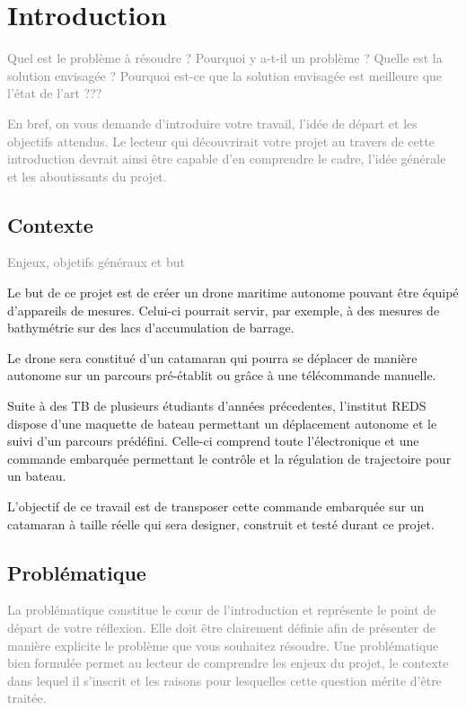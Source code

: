 \chapter{Introduction}

\textcolor{gray}{Quel est le problème à résoudre ? Pourquoi y a-t-il un problème ? Quelle est la solution envisagée ? Pourquoi est-ce que la solution envisagée est meilleure que l'état de l'art ???}

\textcolor{gray}{En bref, on vous demande d'introduire votre travail, l'idée de départ et les objectifs attendus. Le lecteur qui découvrirait votre projet au travers de cette introduction devrait ainsi être capable d'en comprendre le cadre, l'idée générale et les aboutissants du projet.}

\section{Contexte}

\textcolor{gray}{Enjeux, objetifs généraux et but}

Le but de ce projet est de créer un drone maritime autonome pouvant être équipé d’appareils de mesures. Celui-ci pourrait servir, par exemple, à des mesures de bathymétrie sur des lacs d’accumulation de barrage.

Le drone sera constitué d’un catamaran qui pourra se déplacer de manière autonome sur un parcours pré-établit ou grâce à une télécommande manuelle.

Suite à des TB de plusieurs étudiants d'années précedentes, l’institut REDS dispose d’une maquette de bateau permettant un déplacement autonome et le suivi d’un parcours prédéfini. Celle-ci comprend toute l’électronique et une commande embarquée permettant le contrôle et la régulation de trajectoire pour un bateau.

L’objectif de ce travail est de transposer cette commande embarquée sur un catamaran à taille réelle qui sera designer, construit et testé durant ce projet.

\section{Problématique}

\textcolor{gray}{La problématique constitue le cœur de l'introduction et représente le point de départ de votre réflexion. Elle doit être clairement définie afin de présenter de manière explicite le problème que vous souhaitez résoudre. Une problématique bien formulée permet au lecteur de comprendre les enjeux du projet, le contexte dans lequel il s'inscrit et les raisons pour lesquelles cette question mérite d'être traitée.}


